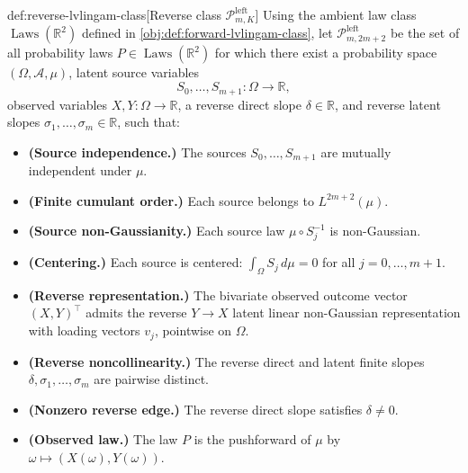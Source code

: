 \begin{definitionv}{def:reverse-lvlingam-class}[Reverse class \(\mathcal P^{\mathrm{left}}_{m,K}\)]
Using the ambient law class \(\operatorname{Laws}(\mathbb R^2)\) defined in \cref{obj:def:forward-lvlingam-class}, let \(\mathcal P^{\mathrm{left}}_{m,2m+2}\) be the set of all probability laws \(P\in \operatorname{Laws}(\mathbb R^2)\) for which there exist a probability space \((\Omega,\mathcal A,\mu)\), latent source variables
\[
S_0,\ldots,S_{m+1}:\Omega\to\mathbb R,
\]
observed variables \(X,Y:\Omega\to\mathbb R\), a reverse direct slope \(\delta\in\mathbb R\), and reverse latent slopes \(\sigma_1,\ldots,\sigma_m\in\mathbb R\), such that:
\begin{itemize}
\item \textbf{(Source independence.)} The sources \(S_0,\ldots,S_{m+1}\) are mutually independent under \(\mu\).
\item \textbf{(Finite cumulant order.)} Each source belongs to \(L^{2m+2}(\mu)\).
\item \textbf{(Source non-Gaussianity.)} Each source law \(\mu\circ S_j^{-1}\) is non-Gaussian.
\item \textbf{(Centering.)} Each source is centered: \(\int_\Omega S_j\,d\mu=0\) for all \(j=0,\ldots,m+1\).
\item \textbf{(Reverse representation.)} The bivariate observed outcome vector \((X,Y)^\top\) admits the reverse \(Y\to X\) latent linear non-Gaussian representation with loading vectors \(v_j\), pointwise on \(\Omega\).
\item \textbf{(Reverse noncollinearity.)} The reverse direct and latent finite slopes \(\delta,\sigma_1,\ldots,\sigma_m\) are pairwise distinct.
\item \textbf{(Nonzero reverse edge.)} The reverse direct slope satisfies \(\delta\ne 0\).
\item \textbf{(Observed law.)} The law \(P\) is the pushforward of \(\mu\) by \(\omega\mapsto (X(\omega),Y(\omega))\).
\end{itemize}
\end{definitionv}

